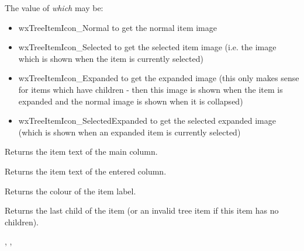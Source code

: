 The value of {\it which} may be:

\begin{itemize}\itemsep=0pt
\item{wxTreeItemIcon\_Normal} to get the normal item image
\item{wxTreeItemIcon\_Selected} to get the selected item image (i.e. the image
which is shown when the item is currently selected)
\item{wxTreeItemIcon\_Expanded} to get the expanded image (this only
makes sense for items which have children - then this image is shown when the
item is expanded and the normal image is shown when it is collapsed)
\item{wxTreeItemIcon\_SelectedExpanded} to get the selected expanded image
(which is shown when an expanded item is currently selected)
\end{itemize}

\label{wxtreelistctrlgetitemtext}


Returns the item text of the main column.


Returns the item text of the entered column.

\label{wxtreelistctrlgetitemtextcolour}


Returns the colour of the item label.

\label{wxtreelistctrlgetlastchild}


Returns the last child of the item (or an invalid tree item if this item has no children).


,
,

\label{wxtreelistctrlgetlinespacing}


